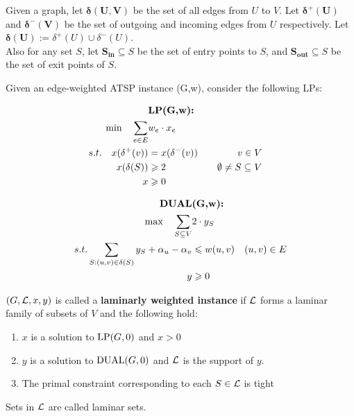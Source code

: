 \documentclass[./main.tex]{subfiles}
\begin{document}
	\begin{definition}
		Given a graph, let $\bm{\delta(U,V)}$ be the set of all edges from $U$ to $V$.
		Let $\bm{\delta^+(U)}$ and $\bm{\delta^-(V)}$ be the set of outgoing and incoming edges from $U$ respectively.
		Let $\bm{\delta(U)}:=\delta^+(U)\cup \delta^-(U)$.
		\\Also for any set $S$, let $\bm{S_{in}}\subseteq S$ be the set of entry points to $S$, and $\bm{S_{out}}\subseteq S$ be the set of exit points of $S$.
	\end{definition}\vspace{4mm}

	\begin{definition}
		Given an edge-weighted ATSP instance (G,w), consider the following LPs:\\
		\begin{minipage}{0.40\textwidth}
			\begin{align*}
				&\textbf{\textup{LP}(G,w):}\\
				\min\quad\sum_{e\in E}&w_e\cdot x_e\\
				s.t.\quad x(\delta^+(v)) & = x(\delta^-(v))\quad & v\in V\quad                     \\
				x(\delta(S))             & \geqslant 2\quad           & \emptyset\neq S\subseteq V\quad \\
				x&\geqslant 0
			\end{align*}
		\end{minipage}
		\hfill\vline
		\begin{minipage}{0.65\textwidth}
			\begin{align*}
				\textbf{\textup{DUAL}}                                                 & \textbf{(G,w):}             \\
				\max\quad\sum_{S\subseteq V}                                  & 2\cdot y_S                  \\
				s.t.\sum_{S:(u,v)\in \delta(S)}y_S + \alpha_u - \alpha_v & \leqslant w(u,v)\quad (u,v)\in E \\
				y                                                             & \geqslant 0
			\end{align*}
		\end{minipage}
		\vspace{7mm}
	\end{definition}

	\begin{definition}
		$(G,\mathcal{L},x,y)$ is called a \textbf{laminarly weighted instance} if $\mathcal{L}$ forms a laminar family of subsets of $V$ and the following hold:
		\begin{enumerate}
			\item $x$ is a solution to $\textup{LP}(G,0)$ and $x > 0$
			\item $y$ is a solution to $\textup{DUAL}(G,0)$ and $\mathcal{L}$ is the support of $y$.
			\item The primal constraint corresponding to each $S\in \mathcal{L}$ is tight
		\end{enumerate}
		Sets in $\mathcal{L}$ are called laminar sets.
	\end{definition}
\end{document}
